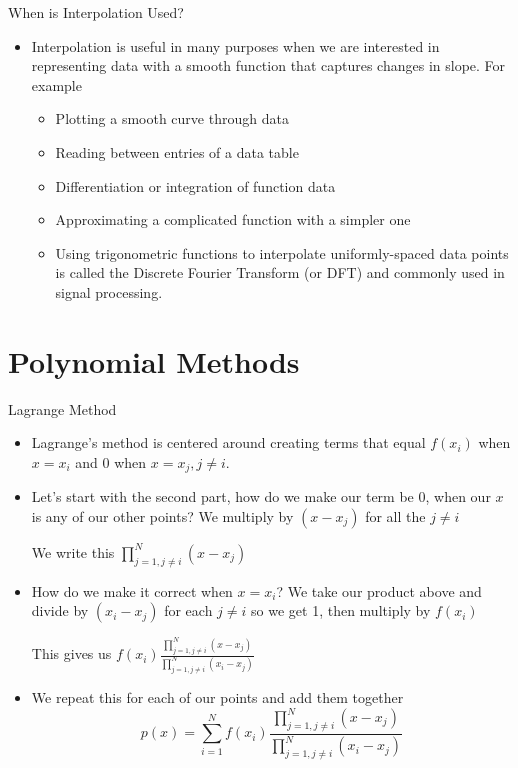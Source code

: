 {}\documentclass[letterpaper,
compress,
xcolor=x11names,
]{beamer}
\begin{document}

\begin{frame}{When is Interpolation Used?}
	\footnotesize
	\begin{itemize}
		\item Interpolation is useful in many purposes when we are interested in representing data with a smooth function that captures changes in slope. For example
		\begin{itemize}
			\item Plotting a smooth curve through data
			\item Reading between entries of a data table
			\item Differentiation or integration of function data
			\item Approximating a complicated function with a simpler one
			\item Using trigonometric functions to interpolate uniformly-spaced data points is called the Discrete Fourier Transform (or DFT) and commonly used in signal processing.
		\end{itemize}
	\end{itemize}
\end{frame}

\section{Polynomial Methods}

\begin{frame}{Lagrange Method}
	\footnotesize
	\begin{itemize}
		\item Lagrange's method is centered around creating terms that equal $f(x_i)$ when $x=x_i$ and 0 when $x=x_j, j\neq i$.
		\item<2-> Let's start with the second part, how do we make our term be 0, when our $x$ is any of our other points? We multiply by $(x-x_j)$ for all the $j\neq i$ 
		\begin{center}
			We write this $\displaystyle\prod_{j=1, j\neq i}^{N}(x-x_j)$
		\end{center}
		\item<3-> How do we make it correct when $x=x_i$? We take our product above and divide by $(x_i-x_j)$ for each $j\neq i$ so we get 1, then multiply by $f(x_i)$
		\begin{center}
			This gives us  $\displaystyle f(x_i)\frac{\prod_{j=1, j\neq i}^{N}(x-x_j)}{\prod_{j=1, j\neq i}^{N}(x_i-x_j)}$
		\end{center}
		\item<4-> We repeat this for each of our points and add them together
		\begin{equation*}
			p(x) = \sum_{i=1}^{N}f(x_i)\frac{\prod_{j=1, j\neq i}^{N}(x-x_j)}{\prod_{j=1, j\neq i}^{N}(x_i-x_j)}
		\end{equation*}
	\end{itemize}
\end{frame}
\end{document}
